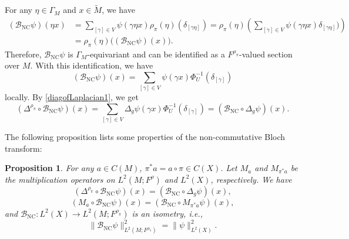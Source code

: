 \documentclass[11pt,oneside,reqno]{amsart}
\newtheorem{proposition}[theorem]{Proposition}
\theoremstyle{definition}
\numberwithin{equation}{section}
\theoremstyle{plain}
\begin{document}

For any $\eta \in \Gamma_{M}$ and $x\in \widetilde{M}$, we have
\begin{equation*}
\begin{aligned}
    (\mathcal{B}_{\mathrm{NC}}\psi) (\eta x) &=\sum_{[\gamma] \in V}\psi(\gamma  \eta x)\rho_{\pi}(\eta)(\delta_{[ \gamma \eta]}) =\rho_{\pi}(\eta)\left( \sum_{[\gamma] \in V}\psi(\gamma  \eta x) \delta_{[\gamma  \eta ]}) \right) \\
    &=\rho_{\pi}(\eta)\big((\mathcal{B}_{\mathrm{NC}}\psi)(x)\big).
\end{aligned}
\end{equation*}
Therefore, $\mathcal{B}_{\mathrm{NC}}\psi$ is $\Gamma_M$-equivariant and can be identified as a $F^{\rho_\pi}$-valued section over $M$. With this identification, we have
\begin{equation*}
    (\mathcal{B}_{\mathrm{NC}}\psi)(x)=\sum_{[\gamma] \in V} \psi(\gamma x) \Phi^{-1}_U (\delta_{[\gamma]})
\end{equation*}
locally. By \eqref{diagofLaplacian1}, we get
\begin{equation}\label{nonblochtwisted}
    (\Delta^{\rho_\pi} \circ\mathcal{B}_{\mathrm{NC}}\psi)(x)=\sum_{[\gamma] \in V} \Delta_g \psi(\gamma x) \Phi^{-1}_U (\delta_{[\gamma]}) = (\mathcal{B}_{\mathrm{NC}}\circ \Delta_g  \psi)(x).
\end{equation}

The following proposition lists some properties of the non-commutative Bloch transform:

\begin{proposition}
For any $a\in C (M)$, $\pi^*a=a\circ \pi \in C (X)$. Let $M_a$ and $M_{\pi^*a}$ be the multiplication operators on $L^2(M;F^{\rho})$ and $L^2(X)$, respectively. We have 
\begin{equation*}
    (\Delta^{\rho_\pi} \circ\mathcal{B}_{\mathrm{NC}}\psi)(x)= (\mathcal{B}_{\mathrm{NC}}\circ \Delta_g  \psi)(x),
\end{equation*}
\begin{equation*}
    (M_a \circ\mathcal{B}_{\mathrm{NC}}\psi)(x)=(\mathcal{B}_{\mathrm{NC}}\circ M_{\pi^*a}  \psi)(x),
\end{equation*}
and $\mathcal{B}_{\mathrm{NC}}:L^2(X)\to L^2(M;F^{\rho_{\pi}})$ is an isometry, \emph{i.e.},
\begin{equation}\label{unitaryofnonbloch}
\|\mathcal{B}_{\mathrm{NC}}\psi\|_{L^2(M;F^{\rho_{\pi}})}^2=\|\psi\|_{L^2(X)}^2.
\end{equation}
\end{proposition}
\end{document}
